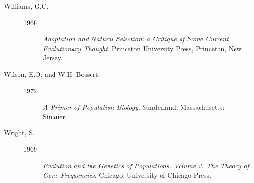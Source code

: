 \documentclass[11pt]{article}
\begin{document}
\begin{description}
\item[Williams, G.C.]
\mbox{}\begin{description}
\item[1966] \emph{Adaptation and Natural Selection: a
Critique of Some Current Evolutionary Thought}. Princeton University
Press, Princeton, New Jersey.  
\end{description}

\item[Wilson, E.O. and W.H. Bossert.]
\mbox{}\begin{description}
\item[1972] \emph{A Primer of Population
Biology}.  Sunderland, Massachusetts: Sinauer.  
\end{description}

\item[Wright, S.]
\mbox{}\begin{description}
\item[1969] \emph{Evolution and the Genetics of Populations.
Volume 2. The Theory of Gene Frequencies}. Chicago: University of Chicago
Press.
\end{description}
\nonfrenchspacing
\end{description} 
\end{document}
